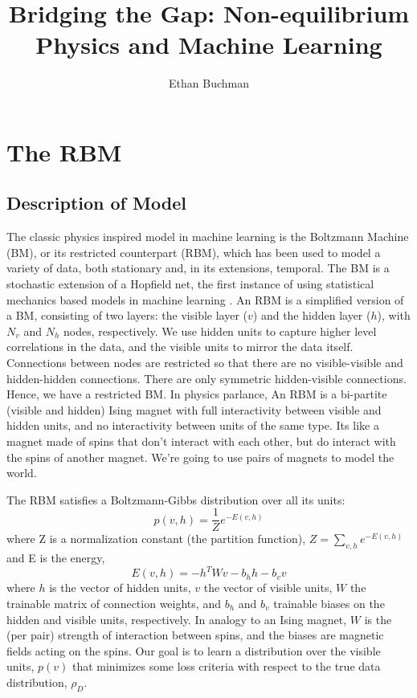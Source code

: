 \documentclass[11pt, oneside]{article}   	%
\title{Bridging the Gap: Non-equilibrium Physics and Machine Learning}
\author{Ethan Buchman}
\begin{document}
\maketitle
\section{The RBM}
\subsection{Description of Model}

The classic physics inspired model in machine learning is the Boltzmann Machine (BM), or its restricted counterpart (RBM), which has been used to model a variety of data, both stationary and, in its extensions, temporal.  The BM is a stochastic extension of a Hopfield net, the first instance of using statistical mechanics based models in machine learning \cite{hopfield}.  An RBM is a simplified version of a BM, consisting of two layers: the visible layer ($v$) and the hidden layer ($h$), with $N_v$ and $N_h$ nodes, respectively.  We use hidden units to capture higher level correlations in the data, and the visible units to mirror the data itself.  Connections between nodes are restricted so that there are no visible-visible and hidden-hidden connections.  There are only symmetric hidden-visible connections.  Hence, we have a restricted BM.  In physics parlance, An RBM is a bi-partite (visible and hidden) Ising magnet with full interactivity between visible and hidden units, and no interactivity between units of the same type.  Its like a magnet made of spins that don't interact with each other, but do interact with the spins of another magnet.  We're going to use pairs of magnets to model the world.

The RBM satisfies a Boltzmann-Gibbs distribution over all its units:
$$ p(v, h) = \frac{1}{Z}e^{-E(v,h)}$$
where Z is a normalization constant (the partition function), $Z = \sum_{v, h} e^{-E(v,h)}$ and E is the energy,
$$E(v,h) = - h^T W v - b_h h - b_v v$$
where $h$ is the vector of hidden units, $v$ the vector of visible units, $W$ the trainable matrix of connection weights, and $b_h$ and $b_v$ trainable biases on the hidden and visible units, respectively.  In analogy to an Ising magnet, $W$ is the (per pair) strength of interaction between spins, and the biases are magnetic fields acting on the spins.  Our goal is to learn a distribution over the visible units, $p(v)$ that minimizes some loss criteria with respect to the true data distribution, $\rho_D$.  
\end{document}

